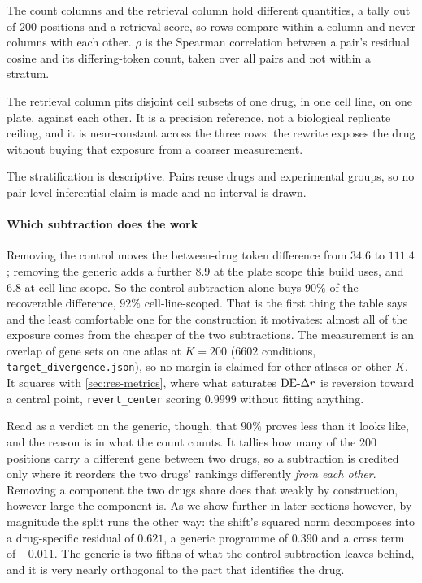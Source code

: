 \begin{table}[htbp]
\begin{fullwidth}
\begin{threeparttable}
  \begin{tablenotes}[flushleft]\footnotesize
  \item The count columns and the retrieval column hold different quantities, a
  tally out of $200$ positions and a retrieval score, so rows compare within a
  column and never columns with each other. $\rho$ is the Spearman correlation
  between a pair's residual cosine and its differing-token count, taken over all
  pairs and not within a stratum.
  \item The retrieval column pits disjoint cell subsets of one drug, in one cell
  line, on one plate, against each other. It is a precision reference, not a
  biological replicate ceiling, and it is near-constant across the three rows: the
  rewrite exposes the drug without buying that exposure from a coarser measurement.
  \item The stratification is descriptive. Pairs reuse drugs and experimental
  groups, so no pair-level inferential claim is made and no interval is drawn.
  \end{tablenotes}
  \end{threeparttable}
  \end{fullwidth}
  \end{table}
  \paragraph{Which subtraction does the work} Removing the control moves the
  between-drug token difference from $34.6$ to $111.4$; removing the generic adds a
  further $8.9$ at the plate scope this build uses, and $6.8$ at cell-line scope. So
  the control subtraction alone buys $90\%$ of the recoverable difference, $92\%$
  cell-line-scoped. That is the first thing the table says and the least comfortable
  one for the construction it motivates: almost all of the exposure comes from the
  cheaper of the two subtractions. The measurement is an overlap of gene sets on one
  atlas at $K = 200$ ($\num{6602}$ conditions, \texttt{target\_divergence.json}), so
  no margin is claimed for other atlases or other $K$. It squares with
  \cref{sec:res-metrics}, where what saturates $\textrm{DE-}\Delta r$ is reversion toward a central
  point, \texttt{revert\_center} scoring $0.9999$ without fitting anything.
  
  Read as a verdict on the generic, though, that $90\%$ proves less than it looks
  like, and the reason is in what the count counts. It tallies how many of the $200$
  positions carry a different gene between two drugs, so a subtraction is credited
  only where it reorders the two drugs' rankings differently \emph{from each other}.
  Removing a component the two drugs share does that weakly by construction, however
  large the component is. As we show further in later sections however, by magnitude the split runs the other way: the shift's
  squared norm decomposes into a drug-specific residual of $0.621$, a generic
  programme of $0.390$ and a cross term of $-0.011$. The generic is two fifths of
  what the control subtraction leaves behind, and it is very nearly orthogonal to
  the part that identifies the drug.
  
